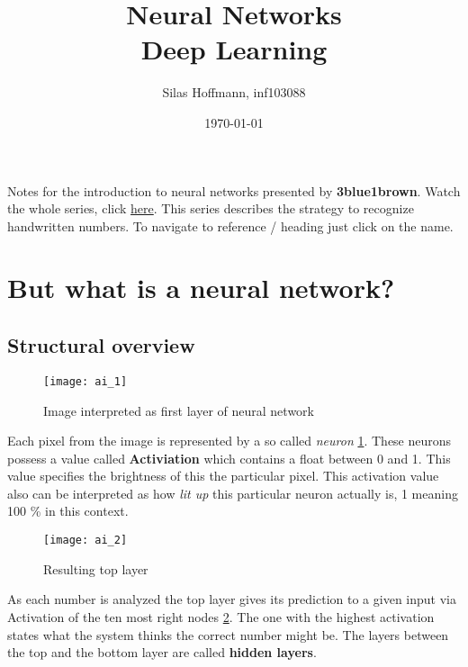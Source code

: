 \documentclass{article}
\title{%
Neural Networks \\
\large Deep Learning}
\author{Silas Hoffmann, inf103088}
\date{\today}
\begin{document}
\maketitle

\vspace{0.5cm}
\tableofcontents
\vspace{1cm}

Notes for the introduction to neural networks presented by \textbf{3blue1brown}. Watch the whole series, click \href{https://www.youtube.com/watch?v=aircAruvnKk}{\color{blue} {here}}. This series describes the strategy to recognize handwritten numbers. To navigate to reference / heading just click on the name.

\clearpage
\listoffigures
\clearpage

\section{But what is a neural network?}


\subsection{Structural overview}

\FloatBarrier

\begin{figure}[h]
	\centering
	\texttt{[image: ai\_1]}
	\label{ai_1}
\caption{Image interpreted as first layer of neural network}
\end{figure}

Each pixel from the image is represented by a so called \textit{neuron} \ref{ai_1}. These neurons possess a value called \textbf{Activiation} which contains a float between 0 and 1. This value specifies the brightness of this the particular pixel. This activation value also can be interpreted as how \textit{lit up} this particular neuron actually is, 1 meaning 100 \% in this context.


\begin{figure}[b!]
	\centering
	\texttt{[image: ai\_2]}
	\label{ai_2}
\caption{Resulting top layer}
\end{figure}

As each number is analyzed the top layer gives its prediction to a given input via Activation of the ten most right nodes \ref{ai_2}. The one with the highest activation states what the system thinks the correct number might be. The layers between the top and the bottom layer are called \textbf{hidden layers}. 
\end{document}
